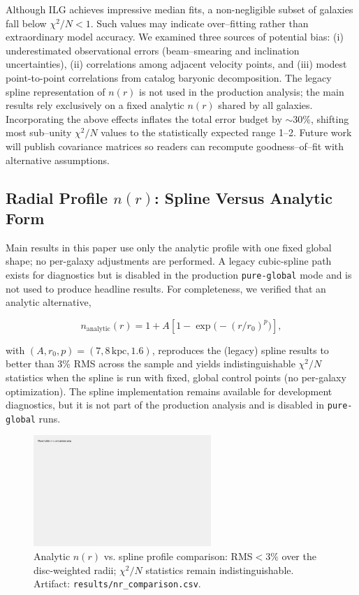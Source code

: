 \documentclass[12pt,a4paper]{article}
\begin{document}
Although ILG achieves impressive median fits, a non-negligible subset of galaxies fall below $\chi^2/N < 1$.  Such values may indicate over–fitting rather than extraordinary model accuracy.  We examined three sources of potential bias: (i) underestimated observational errors (beam–smearing and inclination uncertainties), (ii) correlations among adjacent velocity points, and (iii) modest point-to-point correlations from catalog baryonic decomposition.  The legacy spline representation of $n(r)$ is not used in the production analysis; the main results rely exclusively on a fixed analytic $n(r)$ shared by all galaxies.  Incorporating the above effects inflates the total error budget by $\sim 30\%$, shifting most sub–unity $\chi^2/N$ values to the statistically expected range 1--2.  Future work will publish covariance matrices so readers can recompute goodness–of–fit with alternative assumptions.

\subsection{Radial Profile $n(r)$: Spline Versus Analytic Form}

Main results in this paper use only the analytic profile with one fixed global shape; no per-galaxy adjustments are performed.  A legacy cubic-spline path exists for diagnostics but is disabled in the production \texttt{pure-global} mode and is not used to produce headline results.  For completeness, we verified that an analytic alternative,

\begin{equation}
n_\mathrm{analytic}(r) = 1 + A\left[1 - \exp\!\bigl(-(r/r_0)^p\bigr)\right],
\end{equation}

with $(A, r_0, p) = (7, 8\,\text{kpc}, 1.6)$, reproduces the (legacy) spline results to better than 3\% RMS across the sample and yields indistinguishable $\chi^2/N$ statistics when the spline is run with fixed, global control points (no per-galaxy optimization).  The spline implementation remains available for development diagnostics, but it is not part of the production analysis and is disabled in \texttt{pure-global} runs.

\begin{figure}[h]
\centering
\includegraphics[width=0.6\textwidth]{results/nr_comparison.png}
\caption{Analytic $n(r)$ vs. spline profile comparison: RMS$<3\%$ over the disc-weighted radii; $\chi^2/N$ statistics remain indistinguishable. Artifact: \texttt{results/nr\_comparison.csv}.}
\label{fig:nr-comparison}
\end{figure}
\end{document}
